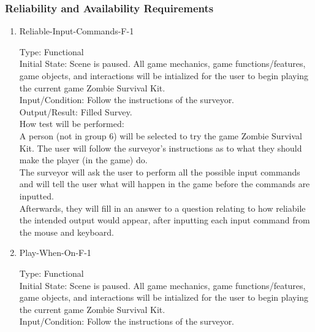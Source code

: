 \documentclass[12pt, titlepage]{article}
\begin{document}
\subsubsection{Reliability and Availability Requirements}

\begin{enumerate}
	
	\item{Reliable-Input-Commands-F-1\\}
	
	Type: Functional \\
	
	Initial State: Scene is paused. All game mechanics, game functions/features, game objects, and interactions will be intialized for the user to begin playing the current game Zombie Survival Kit.\\
	
	Input/Condition: Follow the instructions of the surveyor.\\
	
	Output/Result: Filled Survey.\\
	
	How test will be performed:\\ A person (not in group 6) will be selected to try the game Zombie Survival Kit. The user will follow the surveyor's instructions as to what they should make the player (in the game) do. \\
	The surveyor will ask the user to perform all the possible input commands and will tell the user what will happen in the game before the commands are inputted. \\
	Afterwards, they will fill in an answer to a question relating to how reliabile the intended output would appear, after inputting each input command from the mouse and keyboard.\\
	
	\item{Play-When-On-F-1\\}
	
	Type: Functional\\
	
	Initial State: Scene is paused. All game mechanics, game functions/features, game objects, and interactions will be intialized for the user to begin playing the current game Zombie Survival Kit.\\
	
	Input/Condition: Follow the instructions of the surveyor.\\
	

\end{enumerate}
\end{document}
